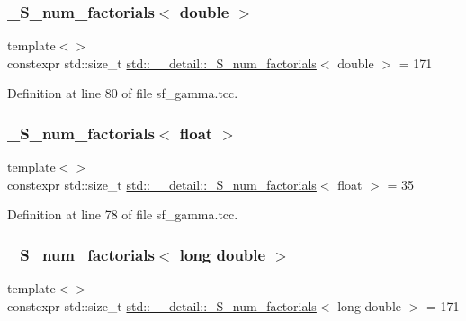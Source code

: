 \subsubsection{\texorpdfstring{\+\_\+\+S\+\_\+num\+\_\+factorials$<$ double $>$}{\_S\_num\_factorials< double >}}
{\footnotesize\ttfamily template$<$$>$ \\
constexpr std\+::size\+\_\+t \hyperlink{namespacestd_1_1____detail_a671f3ba94c1b06be87992486bca37426}{std\+::\+\_\+\+\_\+detail\+::\+\_\+\+S\+\_\+num\+\_\+factorials}$<$ double $>$ = 171}



Definition at line 80 of file sf\+\_\+gamma.\+tcc.

\mbox{\label{namespacestd_1_1____detail_a3a29651303ca2222246ef6f0a17e92ec}} 
\subsubsection{\texorpdfstring{\+\_\+\+S\+\_\+num\+\_\+factorials$<$ float $>$}{\_S\_num\_factorials< float >}}
{\footnotesize\ttfamily template$<$$>$ \\
constexpr std\+::size\+\_\+t \hyperlink{namespacestd_1_1____detail_a671f3ba94c1b06be87992486bca37426}{std\+::\+\_\+\+\_\+detail\+::\+\_\+\+S\+\_\+num\+\_\+factorials}$<$ float $>$ = 35}



Definition at line 78 of file sf\+\_\+gamma.\+tcc.

\mbox{\label{namespacestd_1_1____detail_ab90b8eb39ff963a5ed533a3be0b7f7fd}} 
\subsubsection{\texorpdfstring{\+\_\+\+S\+\_\+num\+\_\+factorials$<$ long double $>$}{\_S\_num\_factorials< long double >}}
{\footnotesize\ttfamily template$<$$>$ \\
constexpr std\+::size\+\_\+t \hyperlink{namespacestd_1_1____detail_a671f3ba94c1b06be87992486bca37426}{std\+::\+\_\+\+\_\+detail\+::\+\_\+\+S\+\_\+num\+\_\+factorials}$<$ long double $>$ = 171}



